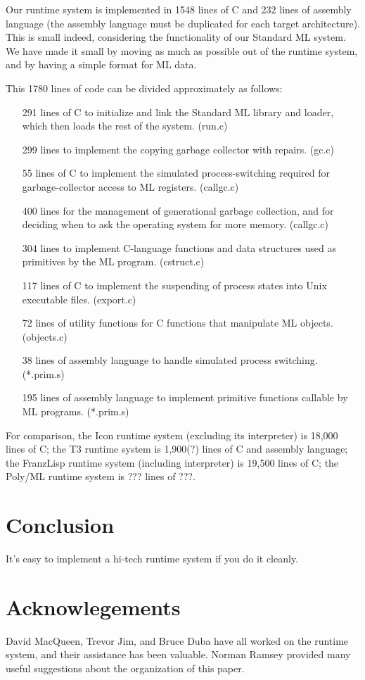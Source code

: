 Our runtime system is implemented in 1548 lines of C and 232 lines of
assembly language (the assembly language must be duplicated for each
target architecture).  This is small indeed, considering the functionality
of our Standard ML system.  We have made it small by moving as much as possible
out of the runtime system, and by having a simple format for ML data.

This 1780 lines of code can be divided approximately as follows:
\begin{enumerate}
\item[291] lines of C to initialize and link the Standard ML library
and loader, which then loads the rest of the system.
{\tiny (run.c)}
\item[299] lines to implement the copying garbage collector with repairs.
{\tiny (gc.c)}
\item[55] lines of C to implement the simulated process-switching required
for garbage-collector access to ML registers.
{\tiny (callgc.c)}
\item[400] lines for the management of generational garbage collection,
and for deciding when to ask the operating system for more memory.
{\tiny (callgc.c)}
\item[304] lines to implement C-language functions and data structures
used as primitives by the ML program.
{\tiny (cstruct.c)}
\item[117] lines of C to implement the suspending of process states into
Unix executable files.
{\tiny (export.c)}
\item[72] lines of utility functions for C functions that manipulate ML
objects.
{\tiny (objects.c)}
\item[38] lines of assembly language to handle simulated process switching.
{\tiny (*.prim.s)}
\item[195] lines of assembly language to implement primitive functions
callable by ML programs.
{\tiny (*.prim.s)}
\end{enumerate}
For comparison, the Icon runtime system\cite{griswold86} (excluding
its interpreter) is 18,000 lines of C; the T3\cite{kranz86} runtime system is
1,900(?) lines of C and assembly language; the FranzLisp runtime system
(including interpreter)
is 19,500 lines of C; the Poly/ML runtime system is ??? lines of ???.

\section{Conclusion}
\label{conclusion}

It's easy to implement a hi-tech runtime system if you do it cleanly.

\section{Acknowlegements}

David MacQueen, Trevor Jim, and Bruce Duba have all worked on the runtime
system, and their assistance has been valuable.  Norman Ramsey provided
many useful suggestions about the organization of this paper.




